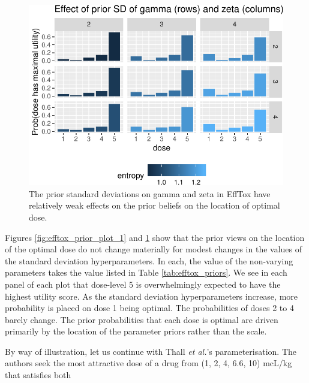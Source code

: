 \documentclass[article]{jss}
\begin{document}
\begin{CodeChunk}
\begin{figure}

{\centering \includegraphics{trialr_files/figure-latex/efftox_prior_plot_2-1} 

}

\caption[The prior standard deviations on gamma and zeta in EffTox have relatively weak effects on the prior beliefs on the location of optimal dose]{The prior standard deviations on gamma and zeta in EffTox have relatively weak effects on the prior beliefs on the location of optimal dose.}\label{fig:efftox_prior_plot_2}
\end{figure}
\end{CodeChunk}

Figures \ref{fig:efftox_prior_plot_1} and \ref{fig:efftox_prior_plot_2}
show that the prior views on the location of the optimal dose do not
change materially for modest changes in the values of the standard
deviation hyperparameters. In each, the value of the non-varying
parameters takes the value listed in Table \ref{tab:efftox_priors}. We
see in each panel of each plot that dose-level 5 is overwhelmingly
expected to have the highest utility score. As the standard deviation
hyperparameters increase, more probability is placed on dose 1 being
optimal. The probabilities of doses 2 to 4 barely change. The prior
probabilities that each dose is optimal are driven primarily by the
location of the parameter priors rather than the scale.

By way of illustration, let us continue with Thall \textit{et al.}'s
parameterisation. The authors seek the most attractive dose of a drug
from (1, 2, 4, 6.6, 10) mcL/kg that satisfies both
\end{document}
